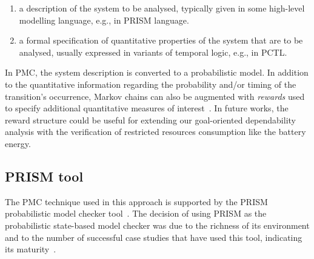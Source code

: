 \begin{enumerate}

\item a description of the system to be analysed, typically given in some high-level modelling language, e.g., in PRISM language.
\medskip

\item a formal specification of quantitative properties of the system that are to be analysed, usually expressed in variants of temporal logic, e.g., in PCTL.
\medskip

\end{enumerate}

In PMC, the system description is converted to a probabilistic model. In addition to the quantitative information regarding the probability and/or timing of the transition's occurrence, Markov chains can also be augmented with \textit{rewards} used to specify additional quantitative measures of interest~\cite{Kwiatkowska:2009}. In future works, the reward structure could be useful for extending our goal-oriented dependability analysis with the verification of restricted resources consumption like the battery energy.


\subsection{PRISM tool}


The PMC technique used in this approach is supported by the PRISM probabilistic model checker tool~\cite{PRISM:main}. The decision of using PRISM as the probabilistic state-based model checker was due to the richness of its environment and to the number of successful case studies that have used this tool, indicating its maturity~\cite{PRISM:pubs}.


